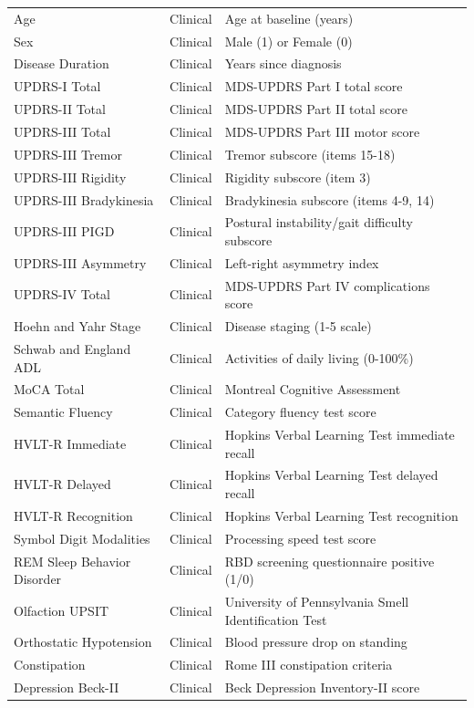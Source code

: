 \documentclass[11pt]{article}
\begin{document}
\begin{longtable}{p{} p{} p{}}
Age & Clinical & Age at baseline (years) \\
Sex & Clinical & Male (1) or Female (0) \\
Disease Duration & Clinical & Years since diagnosis \\
UPDRS-I Total & Clinical & MDS-UPDRS Part I total score \\
UPDRS-II Total & Clinical & MDS-UPDRS Part II total score \\
UPDRS-III Total & Clinical & MDS-UPDRS Part III motor score \\
UPDRS-III Tremor & Clinical & Tremor subscore (items 15-18) \\
UPDRS-III Rigidity & Clinical & Rigidity subscore (item 3) \\
UPDRS-III Bradykinesia & Clinical & Bradykinesia subscore (items 4-9, 14) \\
UPDRS-III PIGD & Clinical & Postural instability/gait difficulty subscore \\
UPDRS-III Asymmetry & Clinical & Left-right asymmetry index \\
UPDRS-IV Total & Clinical & MDS-UPDRS Part IV complications score \\
Hoehn and Yahr Stage & Clinical & Disease staging (1-5 scale) \\
Schwab and England ADL & Clinical & Activities of daily living (0-100\%) \\
MoCA Total & Clinical & Montreal Cognitive Assessment \\
Semantic Fluency & Clinical & Category fluency test score \\
HVLT-R Immediate & Clinical & Hopkins Verbal Learning Test immediate recall \\
HVLT-R Delayed & Clinical & Hopkins Verbal Learning Test delayed recall \\
HVLT-R Recognition & Clinical & Hopkins Verbal Learning Test recognition \\
Symbol Digit Modalities & Clinical & Processing speed test score \\
REM Sleep Behavior Disorder & Clinical & RBD screening questionnaire positive (1/0) \\
Olfaction UPSIT & Clinical & University of Pennsylvania Smell Identification Test \\
Orthostatic Hypotension & Clinical & Blood pressure drop on standing \\
Constipation & Clinical & Rome III constipation criteria \\
Depression Beck-II & Clinical & Beck Depression Inventory-II score \\

\end{longtable}
\end{document}
